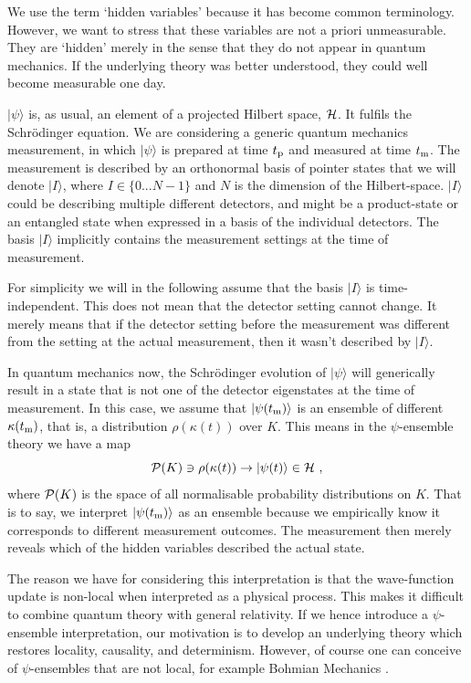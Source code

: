 \documentclass[superscriptaddress,twocolumn,floatfix,nofootinbib]{revtex4-2}
\begin{document}
We use the term `hidden variables' because it has become common terminology. However, we want to stress that these variables are not a priori unmeasurable. They are `hidden' merely in the sense that they do not appear in quantum mechanics. If the underlying theory was better understood, they could well become measurable one day. 

$|\psi \rangle$ is, as usual, an element of a projected Hilbert space, ${\cal H}$. It fulfils the Schr\"odinger equation. We are considering a generic quantum mechanics measurement, in which $|\psi \rangle$ is prepared at time $t_{\rm p}$ and measured at time $t_{\rm m}$. The measurement is described by an orthonormal basis of pointer states that we will denote $|I \rangle$, where $I \in \{0... N-1\}$ and $N$ is the dimension of the Hilbert-space. $|I\rangle$ could be describing multiple different detectors, and might be a product-state or an entangled state when expressed in a basis of the individual detectors. The basis $|I\rangle$ implicitly contains the measurement settings at the time of measurement. 

For simplicity we will in the following assume that the basis $|I \rangle$ is time-independent. This does not mean that the detector setting cannot change. It merely means that if the detector setting before the measurement was different from the setting at the actual measurement, then it wasn't described by $|I\rangle$. 

In quantum mechanics now, the Schr\"odinger evolution of $|\psi\rangle$ will generically result in a state that is not one of the detector eigenstates at the time of measurement. In this case, we assume that $|\psi(t_{\rm m}) \rangle$ is an ensemble of different $\kappa(t_{\rm m})$, that is, a distribution $\rho(\kappa(t))$ over $K$. This means in the $\psi$-ensemble theory we have a map
\begin{equation}
    {\cal P}(K) \ni \rho(\kappa(t))\to |\psi(t) \rangle \in {\cal H}~,
\end{equation}
where ${\cal P}(K)$ is the space of all normalisable probability distributions on $K$.
That is to say, we interpret $|\psi(t_{\rm m}) \rangle$ as an ensemble because we empirically know it corresponds to different measurement outcomes. The measurement then merely reveals which of the hidden variables described the actual state. 

The reason we have for considering this interpretation is that the wave-function update is non-local when interpreted as a physical process. This makes it difficult to combine quantum theory with general relativity. If we hence introduce a $\psi$-ensemble interpretation, our  motivation is to develop an underlying theory which restores locality, causality, and determinism. However, of course one can conceive of $\psi$-ensembles that are not local, for example Bohmian Mechanics \cite{Bohm1952Bohm}.
\end{document}
